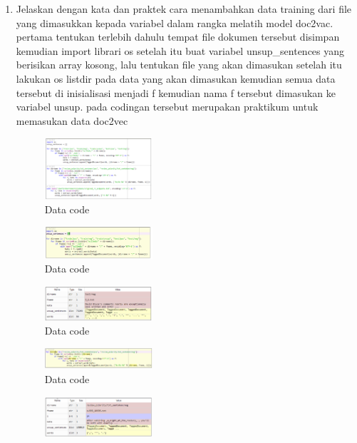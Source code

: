 \begin{enumerate}
    \item Jelaskan dengan kata dan praktek cara menambahkan data training dari ﬁle yang dimasukkan kepada variabel dalam rangka melatih model doc2vac. 
    pertama tentukan terlebih dahulu tempat file dokumen tersebut disimpan kemudian import librari os setelah itu buat variabel unsup\_sentences yang berisikan array kosong, lalu tentukan file yang akan dimasukan setelah itu lakukan os listdir pada data yang akan dimasukan kemudian semua data tersebut di inisialisasi menjadi f kemudian nama f tersebut dimasukan ke variabel unsup. pada codingan tersebut merupakan praktikum untuk memasukan data doc2vec
    \begin{figure}[H]
        \includegraphics[width=4cm]{figures/1174096/tugas5/praktek4_1.PNG}
        \centering
        \caption{Data code}
    \end{figure}
    \begin{figure}[H]
        \includegraphics[width=4cm]{figures/1174096/tugas5/praktek4_2.PNG}
        \centering
        \caption{Data code}
    \end{figure}
    \begin{figure}[H]
        \includegraphics[width=4cm]{figures/1174096/tugas5/praktek4_3.PNG}
        \centering
        \caption{Data code}
    \end{figure}
    \begin{figure}[H]
        \includegraphics[width=4cm]{figures/1174096/tugas5/praktek4_4.PNG}
        \centering
        \caption{Data code}
    \end{figure}
    \begin{figure}[H]
        \includegraphics[width=4cm]{figures/1174096/tugas5/praktek4_5.PNG}

\end{figure}
\end{enumerate}
